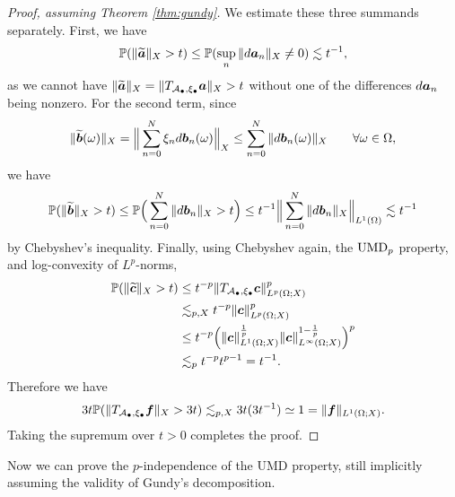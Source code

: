 \begin{proof}[Proof, assuming Theorem \ref{thm:gundy}]
  We estimate these three summands separately.
  First, we have
  \begin{equation*}
    \begin{aligned}
      \mathbb{P}(\|\widetilde{ \bm{a} }\|_{X} > t)
      \leq \mathbb{P}(\sup_{n} \|d \bm{a}_{n}\|_{X} \neq 0) \lesssim t^{-1},
    \end{aligned}
  \end{equation*}
  as we cannot have $\| \widetilde{ \bm{a} }  \|_{X} = \|T_{ \mathcal{A}_{\bullet}, \xi_{\bullet} } \bm{a}\|_{X}> t$ without one of the differences $d\bm{a}_{n}$ being nonzero.
  For the second term, since
  \begin{equation*}
    \|\widetilde{\bm{b}}(\omega)\|_{X} = \Big\| \sum_{n=0}^{N} \xi_{n} d\bm{b}_{n}(\omega) \Big\|_{X} \leq \sum_{n = 0}^{N} \|d\bm{b}_{n}(\omega)\|_{X} \qquad \forall \omega \in \Omega,
  \end{equation*}
  we have
  \begin{equation*}
    \mathbb{P}(\|\widetilde{\bm{b}}\|_{X} > t) \leq \mathbb{P}\Big( \sum_{n = 0}^{N} \|d\bm{b}_{n}\|_{X} > t \Big)
    \leq t^{-1} \Big\|  \sum_{n = 0}^{N} \|d\bm{b}_{n}\|_{X} \Big\|_{L^1(\Omega)} \lesssim t^{-1}
  \end{equation*}
  by Chebyshev's inequality.
  Finally, using Chebyshev again, the $\mathrm{UMD}_{p}$ property, and log-convexity of $L^p$-norms,
  \begin{equation*}
    \begin{aligned}
      \mathbb{P}(\|\widetilde{\bm{c}}\|_{X} > t)
      &\leq t^{-p}\|T_{\mathcal{A}_{\bullet}, \xi_{\bullet}} \bm{c} \|_{L^p(\Omega;X)}^{p} \\
      &\lesssim_{p,X} t^{-p} \|\bm{c} \|_{L^p(\Omega;X)}^{p} \\
      &\leq t^{-p}  \Big( \|\bm{c} \|_{L^1(\Omega;X)}^{\frac{1}{p}} \|\bm{c}\|_{L^\infty(\Omega;X)}^{1-\frac{1}{p}} \Big)^{p} \\
      &\lesssim_{p} t^{-p}  t^{p-1} = t^{-1} .
    \end{aligned}
  \end{equation*}
  Therefore we have
  \begin{equation*}
    3t\mathbb{P}(\|T_{\mathcal{A}_{\bullet}, \xi_{\bullet}} \bm{f}\|_{X} > 3t)
    \lesssim_{p,X} 3t(3t^{-1}) \simeq 1 = \|\bm{f}\|_{L^{1}(\Omega;X)}.
  \end{equation*}
  Taking the supremum over $t > 0$ completes the proof.
\end{proof}

Now we can prove the $p$-independence of the UMD property, still implicitly assuming the validity of Gundy's decomposition.

